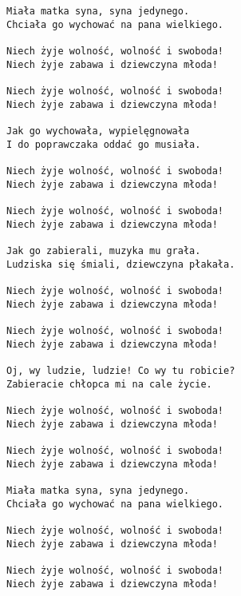 \documentclass[12pt]{article}
\begin{document}
\subsection*{}
\begin{verbatim}
Miała matka syna, syna jedynego.
Chciała go wychować na pana wielkiego.

Niech żyje wolność, wolność i swoboda!
Niech żyje zabawa i dziewczyna młoda!

Niech żyje wolność, wolność i swoboda!
Niech żyje zabawa i dziewczyna młoda!

Jak go wychowała, wypielęgnowała
I do poprawczaka oddać go musiała.

Niech żyje wolność, wolność i swoboda!
Niech żyje zabawa i dziewczyna młoda!

Niech żyje wolność, wolność i swoboda!
Niech żyje zabawa i dziewczyna młoda!

Jak go zabierali, muzyka mu grała.
Ludziska się śmiali, dziewczyna płakała.

Niech żyje wolność, wolność i swoboda!
Niech żyje zabawa i dziewczyna młoda!

Niech żyje wolność, wolność i swoboda!
Niech żyje zabawa i dziewczyna młoda!

Oj, wy ludzie, ludzie! Co wy tu robicie?
Zabieracie chłopca mi na cale życie.

Niech żyje wolność, wolność i swoboda!
Niech żyje zabawa i dziewczyna młoda!

Niech żyje wolność, wolność i swoboda!
Niech żyje zabawa i dziewczyna młoda!

Miała matka syna, syna jedynego.
Chciała go wychować na pana wielkiego.

Niech żyje wolność, wolność i swoboda!
Niech żyje zabawa i dziewczyna młoda!

Niech żyje wolność, wolność i swoboda!
Niech żyje zabawa i dziewczyna młoda!
\end{verbatim}
\clearpage
\end{document}
